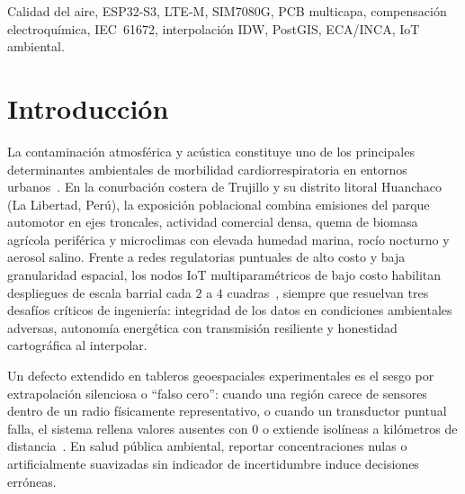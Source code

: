 \documentclass[conference]{IEEEtran}
\begin{document}
\begin{IEEEkeywords}
Calidad del aire, ESP32-S3, LTE-M, SIM7080G, PCB multicapa, compensación electroquímica, IEC~61672, interpolación IDW, PostGIS, ECA/INCA, IoT ambiental.
\end{IEEEkeywords}

\section{Introducción}

La contaminación atmosférica y acústica constituye uno de los principales determinantes ambientales de morbilidad cardiorrespiratoria en entornos urbanos~\cite{who2021aqg}. En la conurbación costera de Trujillo y su distrito litoral Huanchaco (La Libertad, Perú), la exposición poblacional combina emisiones del parque automotor en ejes troncales, actividad comercial densa, quema de biomasa agrícola periférica y microclimas con elevada humedad marina, rocío nocturno y aerosol salino. Frente a redes regulatorias puntuales de alto costo y baja granularidad espacial, los nodos IoT multiparamétricos de bajo costo habilitan despliegues de escala barrial cada $2$ a $4$ cuadras~\cite{castell2017lowcost,morawska2018applications}, siempre que resuelvan tres desafíos críticos de ingeniería: integridad de los datos en condiciones ambientales adversas, autonomía energética con transmisión resiliente y honestidad cartográfica al interpolar.

Un defecto extendido en tableros geoespaciales experimentales es el sesgo por extrapolación silenciosa o ``falso cero'': cuando una región carece de sensores dentro de un radio físicamente representativo, o cuando un transductor puntual falla, el sistema rellena valores ausentes con $0$ o extiende isolíneas a kilómetros de distancia~\cite{li2011reviewidw,rai2017enduser}. En salud pública ambiental, reportar concentraciones nulas o artificialmente suavizadas sin indicador de incertidumbre induce decisiones erróneas.
\end{document}
